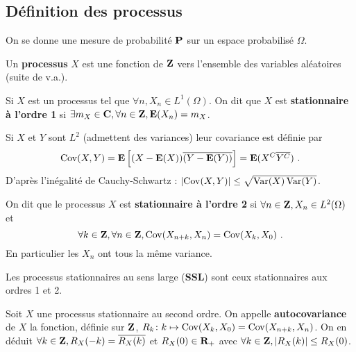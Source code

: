 \subsection{Définition des processus}

	On se donne une mesure de probabilité $\mathbf{P}$ sur un espace probabilisé $\Omega$.
	
	\begin{defn}
		Un \textbf{processus} $X$ est une fonction de $\mathbf{Z}$ vers l'ensemble des variables aléatoires (suite de v.a.).
	\end{defn}
	
	\begin{defn}
		Si $X$ est un processus tel que $\forall n, X_n \in L^1(\Omega)$.
		On dit que $X$ est \textbf{stationnaire à l'ordre 1} si $\exists m_X \in \mathbf{C}, \forall n \in \mathbf{Z}, \mathbf{E}(X_n) = m_X$.
	\end{defn}
	
	\begin{defn}
		Si $X$ et $Y$ sont $L^2$ (admettent des variances) leur covariance est définie par
		\vspace{-0.15cm}$$
		\Cov(X,Y) = \esp \left[ (X - \esp(X)) \overline{(Y - \esp(Y))} \right] = \esp(X^C \overline{Y^C})\ .
		\vspace{-0.15cm}$$
		D'après l'inégalité de Cauchy-Schwartz : $\left\lvert\operatorname{Cov}(X,Y)\right\rvert \leq \sqrt{\operatorname{Var}(X) \operatorname{Var}(Y)}$.
	\end{defn}
	
	\begin{defn}
		On dit que le processus $X$ est \textbf{stationnaire à l'ordre 2} si
		$\forall n \in \mathbf{Z}, X_n \in L^2(\Omega)$ et
		\vspace{-0.15cm}$$
		\forall k \in \Z, \forall n \in \Z, \Cov(X_{n + k},X_n) = \Cov(X_k,X_0)\ .
		\vspace{-0.15cm}$$
		En particulier les $X_n$ ont tous la même variance.
	\end{defn}
	
	\begin{defn}
		Les processus stationnaires au sens large (\textbf{SSL}) sont ceux stationnaires aux ordres 1 et 2.
	\end{defn}
	
	\begin{defn}
		Soit $X$ une processus stationnaire au second ordre.
		On appelle \textbf{autocovariance} de $X$ la fonction, définie sur $\mathbf{Z}$, $R_k \colon k \mapsto \operatorname{Cov}(X_k,X_0) = \operatorname{Cov}(X_{n + k},X_n)$.
		On en déduit $\forall k \in \mathbf{Z}, R_X(-k) = \overline{R_X(k)}$ et $R_X(0) \in \mathbf{R}_+$ avec
		$\forall k \in \mathbf{Z}, \left\lvert R_X(k)\right\rvert \leq R_X(0)$.
	\end{defn}
	
